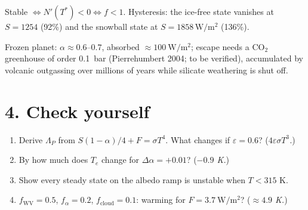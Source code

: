 \documentclass[10pt]{article}
\begin{document}
\smallskip
Stable $\iff N'(T^*)<0\iff f<1$. Hysteresis: the ice-free state vanishes at $S=1254$ (92\%) and the snowball state at $S=1858\,\si{\watt\per\square\metre}$ (136\%).

\begin{extrabox}
Frozen planet: $\alpha\approx0.6$--$0.7$, absorbed $\approx\SI{100}{\watt\per\square\metre}$; escape needs a CO$_2$ greenhouse of order \SI{0.1}{bar} (Pierrehumbert 2004; to be verified), accumulated by volcanic outgassing over millions of years while silicate weathering is shut off.
\end{extrabox}

\section*{4. Check yourself}
\begin{enumerate}[leftmargin=*,itemsep=1pt]
\item Derive $\Lambda_P$ from $S(1-\alpha)/4+F=\sigma T^4$. What changes if $\varepsilon=0.6$? \quad (\emph{$4\varepsilon\sigma T^3$.})
\item By how much does $T_e$ change for $\Delta\alpha=+0.01$? \quad (\emph{$-0.9$ K.})
\item Show every steady state on the albedo ramp is unstable when $T<315$ K.
\item $f_{\mathrm{WV}}=0.5$, $f_\alpha=0.2$, $f_{\mathrm{cloud}}=0.1$: warming for $F=\SI{3.7}{\watt\per\square\metre}$? \quad (\emph{$\approx4.9$ K.})
\end{enumerate}
\end{document}
